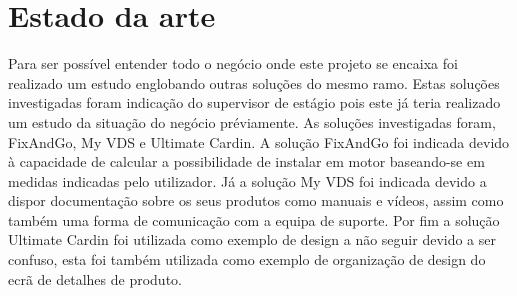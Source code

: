  

 

 

 \section{Estado da arte}
 Para ser possível entender todo o negócio onde este projeto se encaixa foi realizado um estudo
 englobando outras soluções do mesmo ramo. Estas soluções investigadas foram indicação do supervisor
 de estágio pois este já teria realizado um estudo da situação do negócio préviamente.
 As soluções investigadas foram, FixAndGo, My VDS e Ultimate Cardin. A solução FixAndGo 
 foi indicada devido à capacidade de calcular a possibilidade de instalar em motor baseando-se em
 medidas indicadas pelo utilizador. Já a solução My VDS foi indicada devido a dispor documentação sobre
 os seus produtos como manuais e vídeos, assim como também uma forma de comunicação com a equipa de suporte.
 Por fim a solução Ultimate Cardin foi utilizada como exemplo de design a não seguir devido a ser confuso, 
 esta foi também utilizada como exemplo de organização de design do ecrã de detalhes de produto.

 

 \newpage

 

 

 

 

 \newpage

 

 \newpage

 

 \newpage



 \newpage

 

 \newpage

 

 \newpage

 

 \newpage

 

 \newpage

 

 

 \newpage

 

 \newpage

 